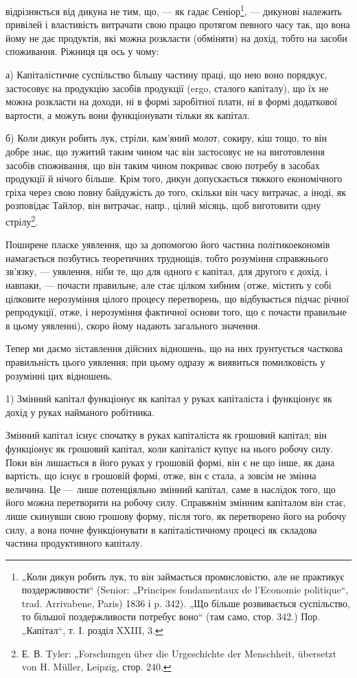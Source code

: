 \parcont{}  %
відрізняється від дикуна не тим, що, — як гадає Сеніор\footnote{
„Коли дикун робить лук, то він займається промисловістю, але не практикує
поздержливости“ (Senior: „Principes fondamentaux de l’Economie politique“,
trad. Arrivabene, Paris) 1836 і p. 342). „Що більше розвивається суспільство, то
більшої поздержливости потребує воно“ (там само, стор. 342.) Пор. „Капітал“,
т. І. розділ XXIII, 3.
}, — дикунові
належить привілей і властивість витрачати свою працю протягом певного
часу так, що вона йому не дає продуктів, які можна розкласти (обміняти)
на дохід, тобто на засоби споживання. Ріжниця ця ось у чому:

а) Капіталістичне суспільство більшу частину праці, що нею воно
порядкує, застосовує на продукцію засобів продукції (ergo, сталого
капіталу), що їх не можна розкласти на доходи, ні в формі заробітної
плати, ні в формі додаткової вартости, а можуть вони функціонувати
тільки як капітал.

б) Коли дикун робить лук, стріли, кам’яний молот, сокиру, кіш тощо,
то він добре знає, що зужитий таким чином час він застосовує не на
виготовлення засобів споживання, що він таким чином покриває свою
потребу в засобах продукції й нічого більше. Крім того, дикун допускається
тяжкого економічного гріха через свою повну байдужість до того,
скільки він часу витрачає, а іноді, як розповідає Тайлор, він витрачає,
напр., цілий місяць, щоб виготовити одну стрілу\footnote{
Е. В. Tyler: „Forschungen über die Urgeschichte der Menschheit, übersetzt
von H. Müller, Leipzig, стор. 240.
}.

Поширене пласке уявлення, що за допомогою його частина політикоекономів
намагається позбутись теоретичних труднощів, тобто розуміння
справжнього зв’язку, — уявлення, ніби те, що для одного є капітал, для
другого є дохід, і навпаки, — почасти правильне, але стає цілком хибним
(отже, містить у собі цілковите нерозуміння цілого процесу перетворень,
що відбувається підчас річної репродукції, отже, і нерозуміння фактичної
основи того, що є почасти правильне в цьому уявленні), скоро йому
надають загального значення.

Тепер ми даємо зіставлення дійсних відношень, що на них ґрунтується
часткова правильність цього уявлення; при цьому одразу ж виявиться
помилковість у розумінні цих відношень.

1) Змінний капітал функціонує як капітал у руках капіталіста і функціонує
як дохід у руках найманого робітника.

Змінний капітал існує спочатку в руках капіталіста як грошовий
капітал; він функціонує як грошовий капітал, коли капіталіст
купує на нього робочу силу. Поки він лишається в його руках у грошовій
формі, він є не що інше, як дана вартість, що існує в грошовій
формі, отже, він є стала, а зовсім не змінна величина. Це — лише потенціяльно
змінний капітал, саме в наслідок того, що його можна перетворити
на робочу силу. Справжнім змінним капіталом він стає, лише скинувши
свою грошову форму, після того, як перетворено його на робочу
силу, а вона почне функціонувати в капіталістичному процесі як складова
частина продуктивного капіталу.
